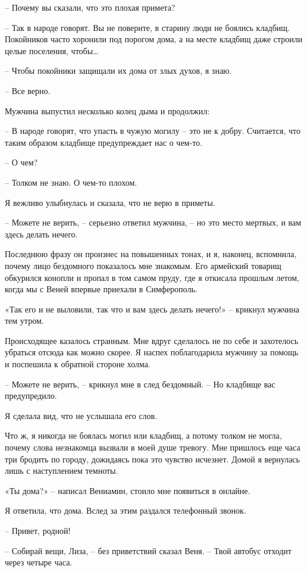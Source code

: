 \documentclass[
]{book}
\begin{document}
-- Почему вы сказали, что это плохая примета?

-- Так в народе говорят. Вы не поверите, в старину люди не боялись кладбищ. Покойников часто хоронили под порогом дома, а на месте кладбищ даже строили целые поселения, чтобы\ldots{}

-- Чтобы покойники защищали их дома от злых духов, я знаю.

-- Все верно.

Мужчина выпустил несколько колец дыма и продолжил:

-- В народе говорят, что упасть в чужую могилу -- это не к добру. Считается, что таким образом кладбище предупреждает нас о чем-то.

-- О чем?

-- Толком не знаю. О чем-то плохом.

Я вежливо улыбнулась и сказала, что не верю в приметы.

-- Можете не верить, -- серьезно ответил мужчина, -- но это место мертвых, и вам здесь делать нечего.

Последнюю фразу он произнес на повышенных тонах, и я, наконец, вспомнила, почему лицо бездомного показалось мне знакомым. Его армейский товарищ обкурился конопли и пропал в том самом пруду, где я откисала прошлым летом, когда мы с Веней впервые приехали в Симферополь.

«Так его и не выловили, так что и вам здесь делать нечего!» -- крикнул мужчина тем утром.

Происходящее казалось странным. Мне вдруг сделалось не по себе и захотелось убраться отсюда как можно скорее. Я наспех поблагодарила мужчину за помощь и поспешила к обратной стороне холма.

-- Можете не верить, -- крикнул мне в след бездомный. -- Но кладбище вас предупредило.

Я сделала вид, что не услышала его слов.

Что ж, я никогда не боялась могил или кладбищ, а потому толком не могла, почему слова незнакомца вызвали в моей душе тревогу. Мне пришлось еще часа три бродить по городу, дожидаясь пока это чувство исчезнет. Домой я вернулась лишь с наступлением темноты.

«Ты дома?» -- написал Вениамин, стоило мне появиться в онлайне.

Я ответила, что дома. Вслед за этим раздался телефонный звонок.

-- Привет, родной!

-- Собирай вещи, Лиза, -- без приветствий сказал Веня. -- Твой автобус отходит через четыре часа.
\end{document}
